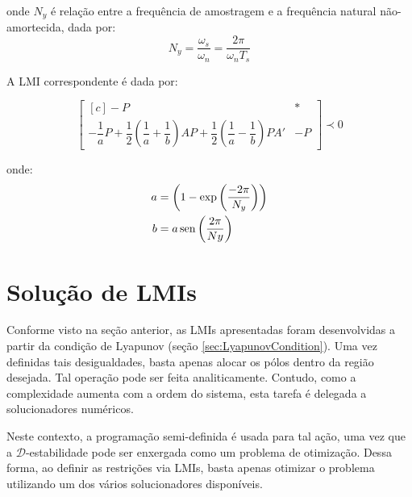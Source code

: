 \noindent onde $N_y$ é relação entre a frequência de amostragem e a frequência natural não-amortecida, dada por:
\begin{equation}
N_y = \dfrac{\omega_s}{\omega_n} = \dfrac{2\pi}{\omega_nT_s}\label{eq:ConstanteNy}
\end{equation}

A LMI correspondente é dada por:

\begin{equation}
\begin{bmatrix*}[c]
-P & *\\
-\dfrac{1}{a}P + \dfrac{1}{2}\left(\dfrac{1}{a}+\dfrac{1}{b}\right)AP + \dfrac{1}{2}\left(\dfrac{1}{a}-\dfrac{1}{b}\right)PA' & -P
\end{bmatrix*}
\prec 0\label{eq:LMIElipse}
\end{equation}

\noindent onde:
\begin{subequations}
\label{eq:PontosElipse}
\begin{align}
a &= \left(1-\exp{\left(\frac{-2\pi}{N_y}\right)}\right)\label{eq:PontoAElipse}\\
b &= a\operatorname{sen}{\left(\frac{2\pi}{Ny}\right)}\label{eq:PontoBElipse}
\end{align}
\end{subequations}

\section{Solução de LMIs}
Conforme visto na seção anterior, as LMIs apresentadas foram desenvolvidas a partir da condição de Lyapunov (seção \ref{sec:LyapunovCondition}). Uma vez definidas tais desigualdades, basta apenas alocar os pólos dentro da região desejada. Tal operação pode ser feita analiticamente. Contudo, como a complexidade aumenta com a ordem do sistema, esta tarefa é delegada a solucionadores numéricos.

Neste contexto, a programação semi-definida é usada para tal ação, uma vez que a $\mathscr{D}$-estabilidade pode ser enxergada como um problema de otimização. Dessa forma, ao definir as restrições via LMIs, basta apenas otimizar o problema utilizando um dos vários solucionadores disponíveis.
